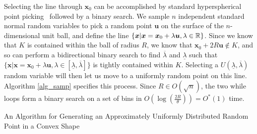 Selecting the line through $\bm{x}_0$ can be accomplished by standard hyperspherical point picking~\cite{mathworld_picking} followed by a binary search. We sample $n$ independent standard normal random variables to pick a random point $\bm{u}$ on the surface of the $n$-dimensional unit ball, and define the line $\{\bm{x} | \bm{x} = \bm{x}_0 + \lambda \bm{u}, \lambda \in \mathbb{R} \}$. Since we know that $K$ is contained within the ball of radius $R$, we know that $\bm{x}_0 + 2R\bm{u} \notin K$, and so can perform a bidirectional binary search to find $\overline{\lambda}$ and $\underline{\lambda}$ such that $\{\bm{x} | \bm{x} = \bm{x}_0 + \lambda \bm{u}, \lambda \in [\underline{\lambda}, \overline{\lambda}] \}$ is tightly contained within $K$. Selecting a $U(\underline{\lambda}, \overline{\lambda})$ random variable will then let us move to a uniformly random point on this line. Algorithm \ref{alg_samp} specifies this process. Since $R \in O(\sqrt{n})$, the two while loops form a binary search on a set of bins in $O(\log(\frac{2R}{\theta})) = O^{*}(1)$ time. 

\begin{algorithm}
\SetAlgoLined
{}

\caption{An Algorithm for Generating an Approximately Uniformly Distributed Random Point in a Convex Shape}\label{alg_samp}

\end{algorithm}

